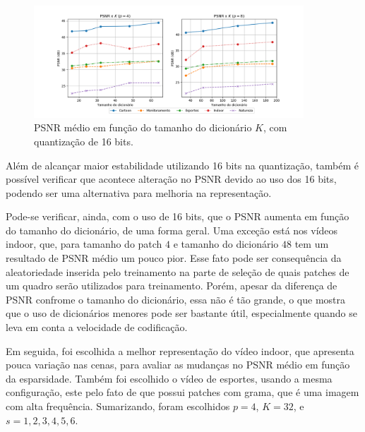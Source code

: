 \documentclass[cic,tc]{iiufrgs}
\begin{document}
\begin{figure}[H]
    \caption{PSNR médio em função do tamanho do dicionário $K$, com quantização de 16 bits.}
    \begin{center}
        \includegraphics[width=0.9\textwidth]{img/graficos/ds_psnr_16bit.png}
    \end{center}
    \label{fig:psnr16bit}
\end{figure}

Além de alcançar maior estabilidade utilizando 16 bits na quantização, 
também é possível verificar que acontece alteração no PSNR devido ao uso 
dos 16 bits, podendo ser uma alternativa para melhoria na representação.

Pode-se verificar, ainda, com o uso de 16 bits, que o PSNR aumenta em função 
do tamanho do dicionário, de uma forma geral.
Uma exceção está nos vídeos indoor, que, para tamanho do patch $4$ e tamanho do dicionário $48$
tem um resultado de PSNR médio um pouco pior.
Esse fato pode ser consequência da aleatoriedade inserida pelo treinamento 
na parte de seleção de quais patches de um quadro serão utilizados para treinamento.
Porém, apesar da diferença de PSNR confrome o tamanho do dicionário, essa não é 
tão grande, o que mostra que o uso de dicionários menores pode ser bastante útil,
especialmente quando se leva em conta a velocidade de codificação.

Em seguida, foi escolhida a melhor representação do vídeo indoor, que apresenta 
pouca variação nas cenas, para avaliar as mudanças no PSNR médio em função da esparsidade.
Também foi escolhido o vídeo de esportes, usando a mesma configuração, este pelo fato 
de que possui patches com grama, que é uma imagem com alta frequência.
Sumarizando, foram escolhidos $p=4$, $K=32$, e $s=1,2,3,4,5,6$.
\end{document}
